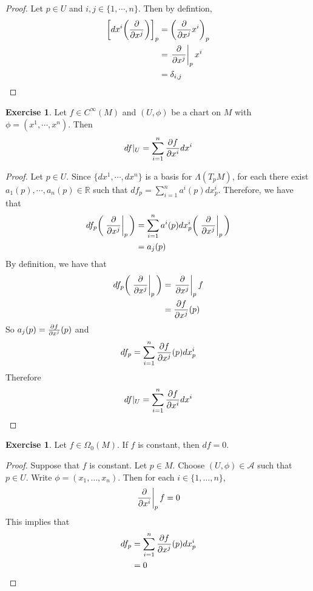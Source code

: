 \documentclass[12pt]{amsart}
\theoremstyle{definition}
\newtheorem{ex}[definition]{Exercise}
\newcommand{\del}{\delta}
\newcommand{\Lam}{\Lambda}
\newcommand{\Om}{\Omega}
\newcommand{\R}{\mathbb{R}}
\newcommand{\MA}{\mathcal{A}}
\begin{document}
	\begin{proof}
		Let $p \in U$ and $i,j \in \{1, \cdots, n\}$. Then  by defintion,
		\begin{align*}
			\bigg[ dx^i \bigg (\pdv{x^j} \bigg ) \bigg]_p 
			&= \bigg( \pdv{x^j} x^i \bigg )_p \\
			&= \eval{\pdv{x^j}}_{p} x^i \\
			&= \del_{i,j} \\
		\end{align*}
	\end{proof}

	\begin{ex}
		Let $f \in C^{\infty}(M)$ and $(U, \phi)$ be a chart on $M$ with $\phi = (x^1, \cdots, x^n)$. Then $$df|_U = \sum_{i=1}^n \pdv{f}{x^i} dx^i$$
	\end{ex}

	\begin{proof}
		Let $p \in U$. Since $\{dx^1, \cdots, dx^n\}$ is a basis for $\Lam(T_pM)$, for each there exist $a_1(p), \cdots, a_n(p) \in \R$ such that $df_p = \sum\limits_{i=1}^n a^i(p)dx^i_p$. Therefore, we have that 
		\begin{align*}
			df_p \bigg(\eval{\pdv{x^j}}_{p} \bigg) 
			&= \sum\limits_{i=1}^n a^i(p)dx^i_p \bigg(\eval{\pdv{x^j}}_{p} \bigg)  \\
			&=  a_j(p)
		\end{align*}
		By definition, we have that 
		\begin{align*}
			df_p\bigg(\eval{\pdv{x^j}}_{p} \bigg) 
			&= \eval{\pdv{x^j}}_{p} f \\ 
			&= {\pdv{f}{x^j}}(p)\\
		\end{align*}
		So $a_j(p) = {\pdv{f}{x^j}}(p)$ and $$df_p = \sum\limits_{i=1}^n {\pdv{f}{x^j}}(p)dx^i_p$$
		Therefore $$df|_U = \sum\limits_{i=1}^n {\pdv{f}{x^i}}dx^i$$
	\end{proof}
	
	\begin{ex}
	Let $f \in \Om_0(M)$. If $f$ is constant, then $df = 0$. 
	\end{ex}
	
	\begin{proof}
	Suppose that $f$ is constant. Let $p \in M$. Choose $(U, \phi) \in \MA$ such that $p \in U$. Write $\phi = (x_1, \dots, x_n)$. Then for each $i \in \{1, \dots, n\}$, $$\eval{\pdv{x^i}}_p f = 0$$ This implies that 
	\begin{align*}
	df_p 
	&= \sum\limits_{i=1}^n {\pdv{f}{x^j}}(p)dx^i_p \\
	&= 0
	\end{align*}
	\end{proof}
	
\end{document}
